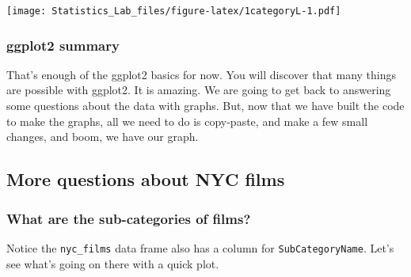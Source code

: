 \documentclass[
]{book}
\begin{document}
\texttt{[image: Statistics\_Lab\_files/figure-latex/1categoryL-1.pdf]}

\hypertarget{ggplot2-summary}{%
\subsubsection{ggplot2 summary}\label{ggplot2-summary}}

That's enough of the ggplot2 basics for now. You will discover that many things are possible with ggplot2. It is amazing. We are going to get back to answering some questions about the data with graphs. But, now that we have built the code to make the graphs, all we need to do is copy-paste, and make a few small changes, and boom, we have our graph.

\hypertarget{more-questions-about-nyc-films}{%
\subsection{More questions about NYC films}\label{more-questions-about-nyc-films}}

\hypertarget{what-are-the-sub-categories-of-films}{%
\subsubsection{What are the sub-categories of films?}\label{what-are-the-sub-categories-of-films}}

Notice the \texttt{nyc\_films} data frame also has a column for \texttt{SubCategoryName}. Let's see what's going on there with a quick plot.
\end{document}
